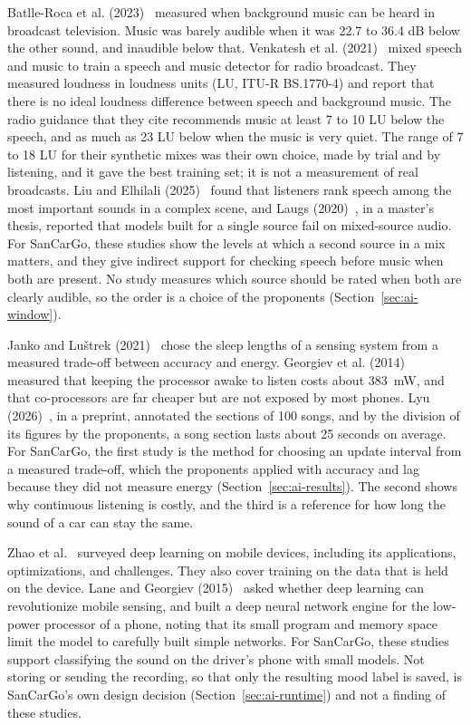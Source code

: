 Batlle-Roca et al. (2023)~\cite{batlleroca2023background} measured when background music can be heard in broadcast television. Music was barely audible when it was 22.7 to 36.4 dB below the other sound, and inaudible below that. Venkatesh et al. (2021)~\cite{venkatesh2021synthesising} mixed speech and music to train a speech and music detector for radio broadcast. They measured loudness in loudness units (LU, ITU-R BS.1770-4) and report that there is no ideal loudness difference between speech and background music. The radio guidance that they cite recommends music at least 7 to 10 LU below the speech, and as much as 23 LU below when the music is very quiet. The range of 7 to 18 LU for their synthetic mixes was their own choice, made by trial and by listening, and it gave the best training set; it is not a measurement of real broadcasts. Liu and Elhilali (2025)~\cite{liu2025salience} found that listeners rank speech among the most important sounds in a complex scene, and Laugs (2020)~\cite{laugs2020mixed}, in a master's thesis, reported that models built for a single source fail on mixed-source audio. For SanCarGo, these studies show the levels at which a second source in a mix matters, and they give indirect support for checking speech before music when both are present. No study measures which source should be rated when both are clearly audible, so the order is a choice of the proponents (Section~\ref{sec:ai-window}).

Janko and Lu{\v{s}}trek (2021)~\cite{janko2021energy} chose the sleep lengths of a sensing system from a measured trade-off between accuracy and energy. Georgiev et al. (2014)~\cite{georgiev2014dspear} measured that keeping the processor awake to listen costs about 383~mW, and that co-processors are far cheaper but are not exposed by most phones. Lyu (2026)~\cite{lyu2026sections}, in a preprint, annotated the sections of 100 songs, and by the division of its figures by the proponents, a song section lasts about 25 seconds on average. For SanCarGo, the first study is the method for choosing an update interval from a measured trade-off, which the proponents applied with accuracy and lag because they did not measure energy (Section~\ref{sec:ai-results}). The second shows why continuous listening is costly, and the third is a reference for how long the sound of a car can stay the same.

Zhao et al.~\cite{zhao2022survey} surveyed deep learning on mobile devices, including its applications, optimizations, and challenges. They also cover training on the data that is held on the device. Lane and Georgiev (2015)~\cite{lane2015deep} asked whether deep learning can revolutionize mobile sensing, and built a deep neural network engine for the low-power processor of a phone, noting that its small program and memory space limit the model to carefully built simple networks. For SanCarGo, these studies support classifying the sound on the driver's phone with small models. Not storing or sending the recording, so that only the resulting mood label is saved, is SanCarGo's own design decision (Section~\ref{sec:ai-runtime}) and not a finding of these studies.

